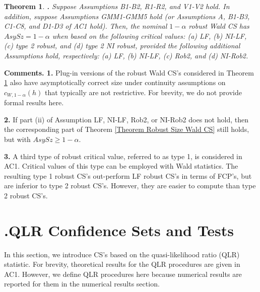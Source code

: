 \documentclass[12pt,thmsb,titlepage,final,oneside,letterpaper]{article}
\newtheorem{theorem}{Theorem}[section]
\begin{document}
\begin{theorem}
\hspace{-0.08in}\textbf{.} \label{Theorem Robust Size Wald CS}Suppose
Assumptions \emph{B1-B2, R1-R2, }and \emph{V1-V2 hold. }In addition, suppose
Assumptions \emph{GMM1-GMM5 }hold \emph{(}or Assumptions \emph{A,} \emph{%
B1-B3,} \emph{C1-C8,} and \emph{D1-D3} of \emph{AC1 }hold\emph{). }Then, the
nominal $1-\alpha $ robust Wald CS has $AsySz=1-\alpha $ when based on the
following critical values\emph{:} \emph{(a) LF,} \emph{(b) NI-LF, (c) }type 
\emph{2} robust, and \emph{(d) }type \emph{2} \emph{NI} robust, provided the
following additional Assumptions hold, respectively\emph{:} \emph{(a) LF,
(b) NI-LF,} \emph{(c) Rob2, }and \emph{(d) NI-Rob2.}
\end{theorem}

\noindent \textbf{Comments. 1. }Plug-in versions of the robust Wald CS's
considered in Theorem \ref{Theorem Robust Size Wald CS} also have
asymptotically correct size under continuity assumptions on $c_{W,1-\alpha
}(h)$ that typically are not restrictive. For brevity, we do not provide
formal results here.

\noindent \textbf{2. }If part (ii) of Assumption LF, NI-LF, Rob2, or NI-Rob2
does not hold, then the corresponding part of Theorem \ref{Theorem Robust
Size Wald CS} still holds, but with $AsySz\geq 1-\alpha .$

\noindent \textbf{3. }A third type of robust critical value, referred to as
type 1, is considered in AC1. Critical values of this type can be employed
with Wald statistics. The resulting type 1 robust CS's out-perform LF robust
CS's in terms of FCP's, but are inferior to type 2 robust CS's. However,
they are easier to compute than type 2 robust CS's.

\section{ \hspace{-0.34in}\textbf{.}\hspace{0.2in}QLR Confidence Sets and
Tests\label{QLR Tests Sec}}

\setcounter{equation}{0}\hspace{0.25in}In this section, we introduce CS's
based on the quasi-likelihood ratio (QLR) statistic. For brevity,
theoretical results for the QLR procedures are given in AC1. However, we
define QLR procedures here because numerical results are reported for them
in the numerical results section.
\end{document}
